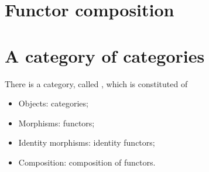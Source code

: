 \section{Functor composition}





\section{A category of categories}


\begin{ctdefinition}
  There is a category, called \Category, which is constituted of
  \begin{itemize}
    \item Objects: categories;
    \item Morphisms: functors;
    \item Identity morphisms: identity functors;
    \item Composition: composition of functors.
  \end{itemize}
\end{ctdefinition}
